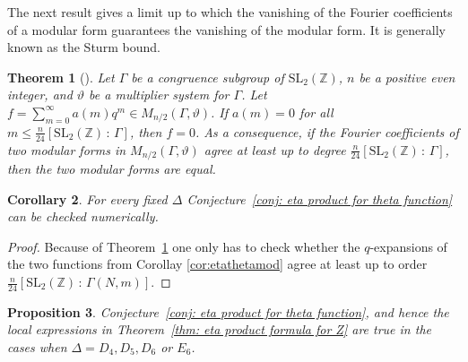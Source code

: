\documentclass{article}
\newtheorem{theorem}{Theorem}[section]
\newtheorem{proposition}[theorem]{Proposition}
\newtheorem{corollary}[theorem]{Corollary}
\theoremstyle{definition}
\newcommand{\ZZ} {{\mathbb Z}}		%
\begin{document}
The next result gives a limit up to which the vanishing of the Fourier coefficients of a modular form guarantees the vanishing of the modular form. It is generally known as the Sturm bound. %
\begin{theorem}[{\cite[Theorem 1]{sturm1987congruence}}]
	\label{thm:sturmbound}
	Let $\Gamma$ be a congruence subgroup of $\mathrm{SL}_2(\ZZ)$, $n$ be a positive even integer, and $\vartheta$ be a multiplier system for $\Gamma$. Let $f=\sum_{m=0}^{\infty} a(m)q^m \in M_{n/2}(\Gamma,\vartheta)$. If $a(m)=0$ for all $m \leq \frac{n}{24} [\mathrm{SL}_2(\ZZ) \, : \, \Gamma ]$, then $f=0$. As a consequence, if the Fourier coefficients of two modular forms in $M_{n/2}(\Gamma,\vartheta)$ agree at least up to degree $\frac{n}{24} [\mathrm{SL}_2(\ZZ) \, : \, \Gamma ]$, then the two modular forms are equal.
\end{theorem}
\begin{corollary}
	For every fixed $\Delta$ Conjecture~\ref{conj: eta product for theta function} can be checked numerically.
\end{corollary}
\begin{proof}
	Because of Theorem~\ref{thm:sturmbound}
	one only has to check whether the $q$-expansions of the two functions from Corollay \ref{cor:etathetamod} agree at least up to order $\frac{n}{24} [\mathrm{SL}_2(\ZZ) \, : \, \Gamma(N,m) ]$.
\end{proof}


\begin{proposition}
	\label{prop:zlocetacheck}
	Conjecture~\ref{conj: eta product for theta function}, and hence the local expressions in Theorem~\ref{thm: eta product formula for Z} are true in the cases when $\Delta=D_4, D_5, D_6$ or $E_6$.
\end{proposition}
\end{document}
